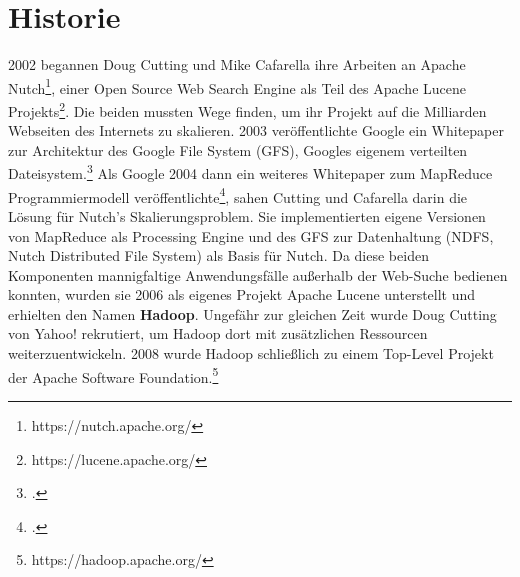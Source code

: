 \section{Historie}
2002 begannen Doug Cutting und Mike Cafarella ihre Arbeiten an Apache Nutch\footnote{https://nutch.apache.org/}, einer Open Source Web Search Engine als Teil des Apache Lucene Projekts\footnote{https://lucene.apache.org/}. Die beiden mussten Wege finden, um ihr Projekt auf die Milliarden Webseiten des Internets zu skalieren. 2003 veröffentlichte Google ein Whitepaper zur Architektur des Google File System (GFS), Googles eigenem verteilten Dateisystem.\footcite[The Google File System]{ghemawat_google_2003} Als Google 2004 dann ein weiteres Whitepaper zum MapReduce Programmiermodell veröffentlichte\footcite[MapReduce: Simplified Data Processing on Large Clusters]{dean_mapreduce_2004}, sahen Cutting und Cafarella darin die Lösung für Nutch's Skalierungsproblem. Sie implementierten eigene Versionen von MapReduce als Processing Engine und des GFS zur Datenhaltung (NDFS, Nutch Distributed File System) als Basis für Nutch. Da diese beiden Komponenten mannigfaltige Anwendungsfälle außerhalb der Web-Suche bedienen konnten, wurden sie 2006 als eigenes Projekt Apache Lucene unterstellt und erhielten den Namen \textbf{Hadoop}. Ungefähr zur gleichen Zeit wurde Doug Cutting von Yahoo! rekrutiert, um Hadoop dort mit zusätzlichen Ressourcen weiterzuentwickeln. 2008 wurde Hadoop schließlich zu einem Top-Level Projekt der Apache Software Foundation.\footnote{https://hadoop.apache.org/}\cite{cutting_next_2016}

\begin{comment}
\section{Hadoop Versionsverlauf}
\subsection{Hadoop 1.x}
Das NDFS wurde zum Hadoop Distributed File System (HDFS) weiterentwickelt.
MapReduce war die einzige Processing Engine -> Nur große Java Applications
Scheduler der Single Point of Failure und Bottleneck

\subsection{Hadoop 2.x}
YARN als neue Ressourcenverwaltung
Hadoop auf Windows
Bottleneck behoben, aber auch Möglichkeit geschaffen, ganz andere Prozesse im Cluster laufen zu lassen
In dem Fall muss man Dateien selbst aufteilen

\subsection{Hadoop 3.x}
Erasure Coding in HDFS
Support for Microsoft Azure Data Lake and Aliyun Object Storage System filesystem connectors
YARN Resource Types
\end{comment}


